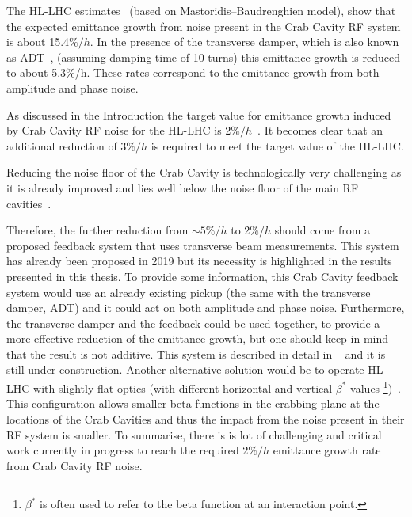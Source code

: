 The HL-LHC estimates~\cite{cc_noise_hl_lhc_estimates} (based on Mastoridis--Baudrenghien model), show that the expected emittance growth from noise present in the Crab Cavity RF system is about 15.4$\%/h$. In the presence of the transverse damper, which is also known as ADT~\cite{lhc_adt_info_presentation}, (assuming damping time of 10 turns) this emittance growth is reduced to about 5.3$\%$/h. These rates correspond to the emittance growth from both amplitude and phase noise. 


As discussed in the Introduction the target value for emittance growth induced by Crab Cavity RF noise for the HL-LHC is 2$\%/h$~\cite{MedinaMedrano:2301928, CC_lumi_limits_philippe, CC_lumi_limits_ilias}. It becomes clear that an additional reduction of 3$\%/h$ is required to meet the target value of the HL-LHC.

Reducing the noise floor of the Crab Cavity is technologically very challenging as it is already improved and lies well below the noise floor of the main RF cavities~\cite{cc_noise_hl_lhc_estimates}. %


Therefore, the further reduction from $\sim 5\%/h$ to 2$\%/h$ should come from a proposed feedback system that uses transverse beam measurements. This system has already been proposed in 2019 but its necessity is highlighted in the results presented in this thesis. To provide some information, this Crab Cavity feedback system would use an already existing pickup (the same with the transverse damper, ADT) and it could act on both amplitude and phase noise.  Furthermore, the transverse damper and the feedback could be used together, to provide a more effective reduction of the emittance growth, but one should keep in mind that the result is not additive. This system is described in detail in ~\cite{Baudrenghien:2665950} and it is still under construction. %
Another alternative solution would be to operate HL-LHC with slightly flat optics (with different horizontal and vertical $\beta^{\ast}$ values \footnote{$\beta^{\ast}$ is often used to refer to the beta function at an interaction point.})~\cite{elias_run4_op}. %
This configuration allows smaller beta functions in the crabbing plane at the locations of the Crab Cavities and thus the impact from the noise present in their RF system is smaller. To summarise, there is is lot of challenging and critical work currently in progress to reach the required $2\%/h$ emittance growth rate from Crab Cavity RF noise.

